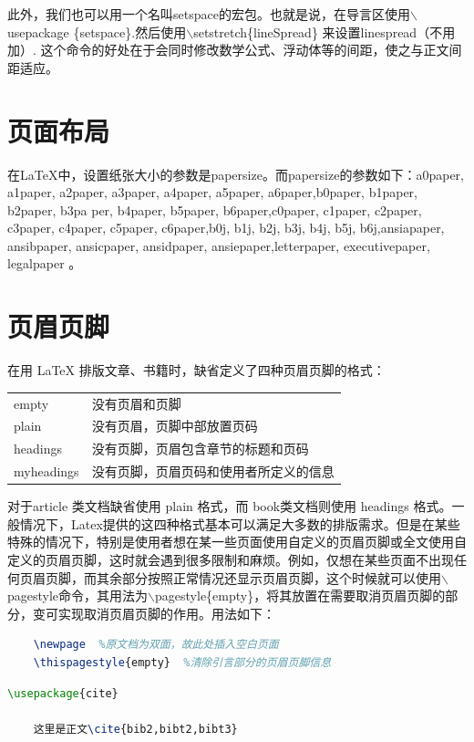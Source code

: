 \documentclass[12pt]{book}
\begin{document}
此外，我们也可以用一个名叫setspace的宏包。也就是说，在导言区使用$\backslash$usepackage \{setspace\}.然后使用$\backslash$setstretch\{lineSpread\} 来设置linespread（不用加\selectfont）. 这个命令的好处在于会同时修改数学公式、浮动体等的间距，使之与正文间距适应。

\section{页面布局}

在\LaTeX{}中，设置纸张大小的参数是papersize。而papersize的参数如下：a0paper, a1paper, a2paper, a3paper, a4paper, a5paper, a6paper,b0paper, b1paper, b2paper, b3pa per, b4paper, b5paper, b6paper,c0paper, c1paper, c2paper, c3paper, c4paper, c5paper, c6paper,b0j, b1j, b2j, b3j, b4j, b5j, b6j,ansiapaper, ansibpaper, ansicpaper, ansidpaper, ansiepaper,letterpaper, executivepaper, legalpaper 。

\section{页眉页脚}

在用 LaTeX 排版文章、书籍时，缺省定义了四种页眉页脚的格式：

\begin{table}[h]
	\centering
	\begin{tabular}{ll}
		empty      & 没有页眉和页脚              \\
		plain      & 没有页眉，页脚中部放置页码        \\
		headings   & 没有页脚，页眉包含章节的标题和页码    \\
		myheadings & 没有页脚，页眉页码和使用者所定义的信息 
	\end{tabular}
\end{table}

对于article 类文档缺省使用 plain 格式，而 book类文档则使用 headings 格式。一般情况下，Latex提供的这四种格式基本可以满足大多数的排版需求。但是在某些特殊的情况下，特别是使用者想在某一些页面使用自定义的页眉页脚或全文使用自定义的页眉页脚，这时就会遇到很多限制和麻烦。例如，仅想在某些页面不出现任何页眉页脚，而其余部分按照正常情况还显示页眉页脚，这个时候就可以使用$\backslash$pagestyle命令，其用法为$\backslash$pagestyle\{empty\}，将其放置在需要取消页眉页脚的部分，变可实现取消页眉页脚的作用。用法如下：
\begin{lstlisting}[language=tex]
	%   %引言部分
	\newpage  %原文档为双面，故此处插入空白页面
	\thispagestyle{empty}  %清除引言部分的页眉页脚信息
\end{lstlisting}
\begin{lstlisting}[language=tex]
	\usepackage{cite}
	
	这里是正文\cite{bib2,bibt2,bibt3}
\end{lstlisting}
\end{document}
